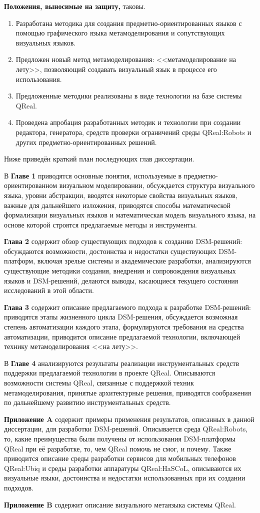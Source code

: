 \textbf{Положения, выносимые на защиту,} таковы.
\begin{enumerate}
	\item Разработана методика для создания предметно-ориентированных языков с помощью 
		графического языка метамоделирования и сопутствующих визуальных языков.
	\item Предложен новый метод метамоделирования: <<метамоделирование на лету>>, позволяющий
		создавать визуальный язык в процессе его использования.
	\item Предложенные методики реализованы в виде технологии на базе системы QReal.
	\item Проведена апробация разработанных методик и технологии при создании редактора, 
		генератора, средств проверки ограничений среды QReal:Robots и других предметно-ориентированных 
		решений.
\end{enumerate}

Ниже приведён краткий план последующих глав диссертации.

В \textbf{Главе 1} приводятся основные понятия, используемые в 
предметно-ориентированном визуальном моделировании, обсуждается структура 
визуального языка, уровни абстракции, вводятся некоторые свойства визуальных 
языков, важные для дальнейшего изложения, приводятся способы математической формализации
визуальных языков и математическая модель визуального языка, на основе которой строятся
предлагаемые методы и инструменты.

\textbf{Глава 2} содержит обзор существующих подходов к созданию \ac{DSM}-решений: 
обсуждаются возможности, достоинства и недостатки существующих \ac{DSM}-платформ, 
включая зрелые системы и академические разработки, анализируются существующие 
методики создания, внедрения и сопровождения визуальных языков и \ac{DSM}-решений, 
делаются выводы, касающиеся текущего состояния исследований в этой области.

\textbf{Глава 3} содержит описание предлагаемого подхода к разработке 
\ac{DSM}-решений: приводятся этапы жизненного цикла \ac{DSM}-решения, обсуждается 
возможная степень автоматизации каждого этапа, формулируются требования на 
средства автоматизации, приводится описание предлагаемой технологии, включающей 
технику метамоделирования <<на лету>>.

В \textbf{Главе 4} анализируются результаты реализации инструментальных средств 
поддержки предлагаемой технологии в проекте QReal. Описываются возможности 
системы QReal, связанные с поддержкой техник метамоделирования, принятые 
архитектурные решения, приводятся соображения по дальнейшему развитию 
инструментальных средств.

\textbf{Приложение A} содержит примеры применения результатов, описанных в данной 
диссертации, для разработки \ac{DSM}-решений. Описывается среда QReal:Robots, то, 
какие преимущества были получены от использования \ac{DSM}-платформы QReal при её 
разработке, то, чем QReal помочь не смог, и почему. Также приводится 
описание среды разработки сервисов для мобильных телефонов QReal:Ubiq и среды
разработки аппаратуры QReal:HaSCoL, описываются их визуальные языки, 
достоинства и недостатки использованных при их создании подходов.

\textbf{Приложение B} содержит описание визуального метаязыка системы QReal.
